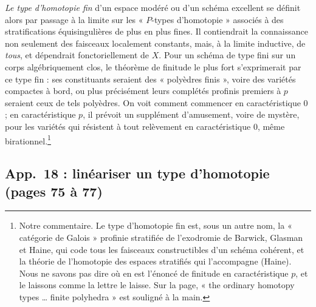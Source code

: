 \documentclass[11pt,a4paper]{article}
\begin{document}
\emph{Le type d'homotopie fin} d'un espace modéré ou d'un schéma excellent se
définit alors par passage à la limite sur les « $P$-types d'homotopie »
associés à des stratifications équisingulières de plus en plus fines. Il
contiendrait la connaissance non seulement des faisceaux localement
constants, mais, à la limite inductive, de \emph{tous}, et dépendrait
fonctoriellement de $X$. Pour un schéma de type fini sur un corps
algébriquement clos, le théorème de finitude le plus fort s'exprimerait par
ce type fin : ses constituants seraient des « polyèdres finis », voire des
variétés compactes à bord, ou plus précisément leurs complétés profinis
premiers à $p$ seraient ceux de tels polyèdres. On voit comment commencer en
caractéristique $0$ ; en caractéristique $p$, il prévoit un supplément
d'amusement, voire de mystère, pour les variétés qui résistent à tout
relèvement en caractéristique $0$, même birationnel.\footnote{Notre
commentaire. Le type d'homotopie fin est, sous un autre nom, la « catégorie
de Galois » profinie stratifiée de l'exodromie de Barwick, Glasman et Haine,
qui code tous les faisceaux constructibles d'un schéma cohérent, et la
théorie de l'homotopie des espaces stratifiés qui l'accompagne (Haine). Nous
ne savons pas dire où en est l'énoncé de finitude en caractéristique $p$, et
le laissons comme la lettre le laisse. Sur la page, « the ordinary homotopy
types … finite polyhedra » est souligné à la main.}

\subsection*{App.~18 : linéariser un type d'homotopie (pages 75 à 77)}
\end{document}
